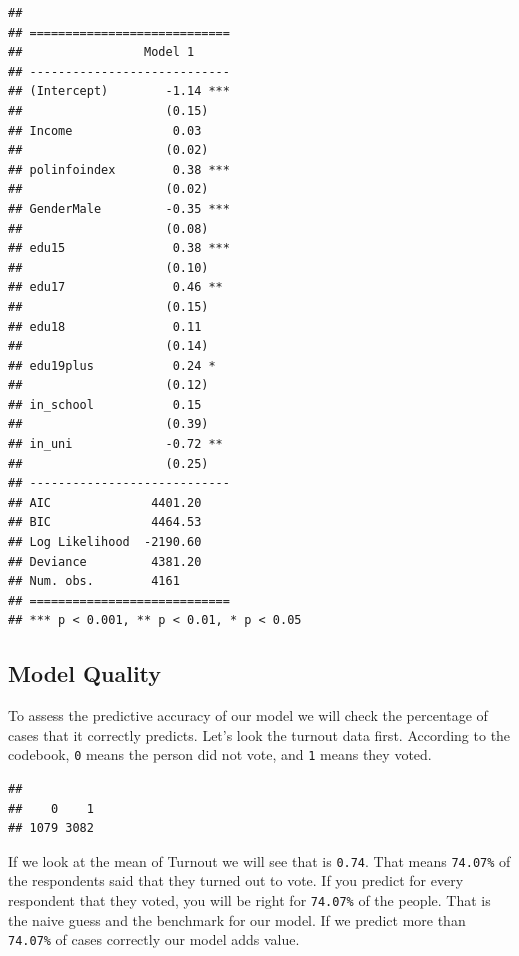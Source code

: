\documentclass[]{article}
\newenvironment{Shaded}{\begin{snugshade}}{\end{snugshade}}
\newcommand{\KeywordTok}[1]{\textcolor[rgb]{0.13,0.29,0.53}{\textbf{{#1}}}}
\newcommand{\NormalTok}[1]{{#1}}
\theoremstyle{definition}
\theoremstyle{definition}
\theoremstyle{remark}
\begin{document}
\begin{verbatim}
## 
## ============================
##                 Model 1     
## ----------------------------
## (Intercept)        -1.14 ***
##                    (0.15)   
## Income              0.03    
##                    (0.02)   
## polinfoindex        0.38 ***
##                    (0.02)   
## GenderMale         -0.35 ***
##                    (0.08)   
## edu15               0.38 ***
##                    (0.10)   
## edu17               0.46 ** 
##                    (0.15)   
## edu18               0.11    
##                    (0.14)   
## edu19plus           0.24 *  
##                    (0.12)   
## in_school           0.15    
##                    (0.39)   
## in_uni             -0.72 ** 
##                    (0.25)   
## ----------------------------
## AIC              4401.20    
## BIC              4464.53    
## Log Likelihood  -2190.60    
## Deviance         4381.20    
## Num. obs.        4161       
## ============================
## *** p < 0.001, ** p < 0.01, * p < 0.05
\end{verbatim}

\subsection{Model Quality}\label{model-quality}

To assess the predictive accuracy of our model we will check the
percentage of cases that it correctly predicts. Let's look the turnout
data first. According to the codebook, \texttt{0} means the person did
not vote, and \texttt{1} means they voted.

\begin{Shaded}
\end{Shaded}

\begin{verbatim}
## 
##    0    1 
## 1079 3082
\end{verbatim}

If we look at the mean of Turnout we will see that is \texttt{0.74}.
That means \texttt{74.07\%} of the respondents said that they turned out
to vote. If you predict for every respondent that they voted, you will
be right for \texttt{74.07\%} of the people. That is the naive guess and
the benchmark for our model. If we predict more than \texttt{74.07\%} of
cases correctly our model adds value.
\end{document}
